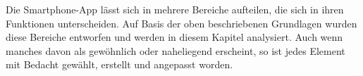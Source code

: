 Die Smartphone-App lässt sich in mehrere Bereiche aufteilen, die sich in ihren Funktionen unterscheiden. Auf Basis der oben beschriebenen Grundlagen wurden diese Bereiche entworfen und werden in diesem Kapitel analysiert. Auch wenn manches davon als gewöhnlich oder naheliegend erscheint, so ist jedes Element mit Bedacht gewählt, erstellt und angepasst worden.